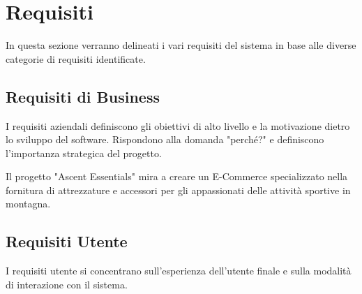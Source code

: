 
\chapter{Requisiti}

In questa sezione verranno delineati i vari requisiti del sistema in base alle diverse categorie di requisiti identificate.

\section{Requisiti di Business}
I requisiti aziendali definiscono gli obiettivi di alto livello e la motivazione dietro lo sviluppo del software. Rispondono alla domanda "perché?" e definiscono l'importanza strategica del progetto.

Il progetto "Ascent Essentials" mira a creare un E-Commerce specializzato nella fornitura di attrezzature e accessori per gli appassionati delle attività sportive in montagna.

\section{Requisiti Utente}
I requisiti utente si concentrano sull'esperienza dell'utente finale e sulla modalità di interazione con il sistema.

